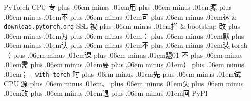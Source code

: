 \documentclass[
]{article}
\newcommand{\passthrough}[1]{#1}
\def\zh#1{{\zhfont #1}}
\def\zhglue{\hskip0pt plus .06em minus .01em}
\begin{document}
{\begin{longtable}[]
PyTorch CPU \zh{专\zhglue 用\zhglue 源\zhglue 不\zhglue 可\zhglue 达} & \passthrough{\lstinline!download.pytorch.org!} SSL \zh{被\zhglue 拦} & bootstrap \zh{改\zhglue 为\zhglue ：\zhglue 默\zhglue 认\zhglue 不\zhglue 装} torch\zh{（\zhglue 课\zhglue 题}01 \zh{不\zhglue 需\zhglue 要\zhglue ）\zhglue ；}\passthrough{\lstinline!--with-torch!} \zh{时\zhglue 先\zhglue 试} CPU \zh{源\zhglue 、\zhglue 失\zhglue 败\zhglue 退\zhglue 回} PyPI \\
\end{longtable}
}
\end{document}
